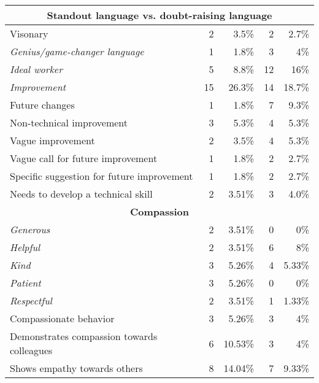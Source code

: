 \documentclass[12pt]{caltech_thesis}
\begin{document}
\begin{table}[htbp]
\begin{adjustbox}{max width=\textwidth - 2cm}
\begin{tabular}{|l|r|r|r|r|}
     \hline
     \multicolumn{5}{|c|}{\textbf{Standout language vs. doubt-raising language}} \\
     \hline
     \hspace{0.5cm} Visonary & 2 & 3.5\% & 2 & 2.7\% \\
     \hspace{0.5cm} \textit{Genius/game-changer language} & 1 & 1.8\% & 3 & 4\% \\
     \hspace{0.5cm} \textit{Ideal worker} & 5 & 8.8\% & 12 & 16\% \\
     \hspace{0.5cm} \textit{Improvement} & 15 & 26.3\% & 14 & 18.7\% \\
     \hspace{0.5cm} Future changes & 1 & 1.8\% & 7 & 9.3\% \\
     \hspace{0.5cm} Non-technical improvement & 3 & 5.3\% & 4 & 5.3\% \\
     \hspace{0.5cm} Vague improvement & 2 & 3.5\% & 4 & 5.3\% \\
     \hspace{0.5cm} Vague call for future improvement & 1 & 1.8\% & 2 & 2.7\% \\
     \hspace{0.5cm} Specific suggestion for future improvement & 1 & 1.8\% & 2 & 2.7\% \\
     \hspace{0.5cm} Needs to develop a technical skill & 2 & 3.51\% & 3 & 4.0\% \\
     \hline
     \multicolumn{5}{|c|}{\textbf{Compassion}} \\
     \hline
     \hspace{0.5cm} \textit{Generous} & 2 & 3.51\% & 0 & 0\% \\
     \hspace{0.5cm} \textit{Helpful} & 2 & 3.51\% & 6 & 8\% \\
     \hspace{0.5cm} \textit{Kind} & 3 & 5.26\% &  4 & 5.33\% \\
     \hspace{0.5cm} \textit{Patient} & 3 & 5.26\% &  0 & 0\% \\
     \hspace{0.5cm} \textit{Respectful} & 2 & 3.51\% &  1 & 1.33\% \\
     \hspace{0.5cm} Compassionate behavior & 3 & 5.26\% &  3 & 4\% \\
     \hspace{0.5cm} Demonstrates compassion towards colleagues & 6 & 10.53\% &  3 & 4\% \\
     \hspace{0.5cm} Shows empathy towards others & 8 & 14.04\% & 7 & 9.33\% \\
     \hline
   \end{tabular}
   \label{tab:rec_given}
\end{adjustbox}
 \end{table}
 \restoregeometry
\end{document}
